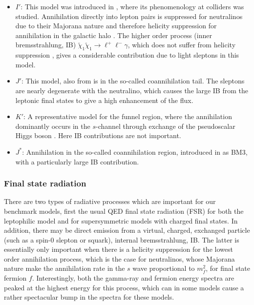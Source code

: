 \documentclass[10pt,aps,pra,reprint,amsmath,amsfonts,amssymb,showpacs]{revtex4-1}
\begin{document}
\begin{itemize}
\item
 $I′$: This model was introduced in \cite{2004EPJC...33..273B}, where
  its phenomenology at colliders was studied. Annihilation directly
  into lepton pairs is suppressed for neutralinos due to their
  Majorana nature and therefore helicity suppression for annihilation
  in the galactic halo \cite{1983PhRvL..50.1419G}. The higher order
  process (inner bremsstrahlung, IB) $\tilde\chi_1\tilde\chi_1\to
  \ell^+\ell^-\gamma$, which does not suffer from helicity suppression
  \cite{1989PhLB..225..372B,2008JHEP...01..049B}, gives a considerable
  contribution due to light sleptons in this model.

\item $J′$: This model, also from \cite{2004EPJC...33..273B} is in the
  so-called coannihilation tail. The sleptons are nearly degenerate
  with the neutralino, which causes the large IB from the leptonic
  final states to give a high enhancement of the flux.

\item $K′$: A representative model for the funnel region, where the
  annihilation dominantly occurs in the $s$-channel through exchange
  of the pseudoscalar Higgs boson \cite{2004EPJC...33..273B}. Here IB
  contributions are not important.

\item $J^*$: Annihilation in the so-called coannihilation region,
  introduced in \cite{2008JHEP...01..049B} as BM3, with a particularly
  large IB contribution.

\end{itemize}



\subsubsection{Final state radiation}
There are two types of radiative processes which are important for our
benchmark models, first the usual QED final state radiation (FSR) for
both the leptophilic model and for supersymmetric models with charged
final states. In addition, there may be direct emission from a
virtual, charged, exchanged particle (such as a spin-0 slepton or
squark), internal bremsstrahlung, IB. The latter is essentially only
important when there is a helicity suppression for the lowest order
annihilation process, which is the case for neutralinos, whose
Majorana nature make the annihilation rate in the $s$ wave
proportional to $m_f^2$, for final state fermion $f$. Interestingly,
both the gamma-ray and fermion energy spectra are peaked at the
highest energy for this process, which can in some models cause a
rather spectacular bump in the spectra for these models.
\end{document}
